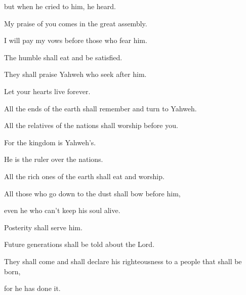 {\par }{\QB but when he cried to him, he heard.
\par }{\BB \par }{\Q {}My praise of you comes in the great assembly.
\par }{\QB I will pay my vows before those who fear him.
\par }{\Q {}The humble shall eat and be satisfied.
\par }{\QB They shall praise Yahweh who seek after him.
\par }{\QB Let your hearts live forever.
\par }{\Q {}All the ends of the earth shall remember and turn to Yahweh.
\par }{\QB All the relatives of the nations shall worship before you.
\par }{\Q {}For the kingdom is Yahweh’s.
\par }{\QB He is the ruler over the nations.
\par }{\Q {}All the rich ones of the earth shall eat and worship.
\par }{\QB All those who go down to the dust shall bow before him,
\par }{\QB even he who can’t keep his soul alive.
\par }{\Q {}Posterity shall serve him.
\par }{\QB Future generations shall be told about the Lord.
\par }{\Q {}They shall come and shall declare his righteousness to a people that shall be born,
\par }{\QB for he has done it.

\par }
